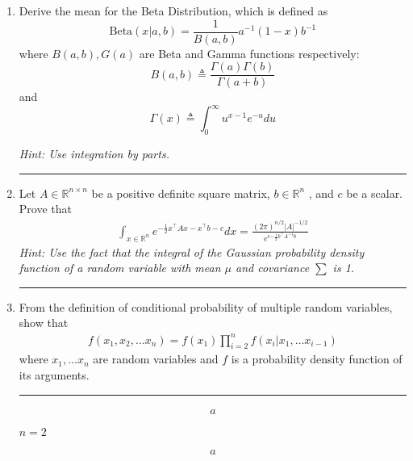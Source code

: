 \documentclass[12pt]{article}
\begin{document}
\begin{enumerate}
    \item Derive the mean for the Beta Distribution, which is defined as 
    \begin{equation}
        \textrm{Beta}(x|a, b)= \frac{1}{B(a, b) } a^{-1}(1 - x)b^{-1} 
    \end{equation}
    where $B(a, b), G(a)$ are Beta and Gamma functions respectively: 
    \begin{equation}
        B(a, b) \triangleq \frac{\Gamma(a)\Gamma(b)}{\Gamma(a + b) }
    \end{equation}
    and 
    \begin{equation}
        \Gamma(x) \triangleq \int_0^{\infty } u^{x-1} e^{-u} d u
    \end{equation}

    \textit{Hint: Use integration by parts. }

    \noindent\rule{\linewidth}{1pt}
    \item Let $A \in \mathbb{R}^{n \times n}$ be a positive definite square matrix, $b \in \mathbb{R}^n$ , and $c$ be a scalar. Prove that
    \begin{align*}  
        \int_{x \in \mathbb{R}^n} e^{-\frac{1}{2} x^\intercal Ax-x^\intercal b-c } dx = \frac{(2\pi)^{n/2} |A|^{-1/2} }{e^{c{-\frac{1}{2}b^\intercal A^{-1} b}}}
    \end{align*}
    \textit{Hint: Use the fact that the integral of the Gaussian probability density function of a random variable with mean $\mu$ and covariance $\sum$ is 1.}
    
    \noindent\rule{\linewidth}{1pt}
    \item From the definition of conditional probability of multiple random variables, show that 
    \begin{align*}
        f(x_1,x_2, \dots x_n) = f(x_1) \prod_{i=2}^{n} f(x_i | x_1, \dots x_{i-1})
    \end{align*}
    where $x_1, \dots x_n$ are random variables and $f$ is a probability density function of its arguments. 

    \noindent\rule{\linewidth}{1pt}

    \begin{align*}
        a
    \end{align*}

    $n=2$

    \begin{align*}
        a
    \end{align*}
\end{enumerate}
\end{document}

